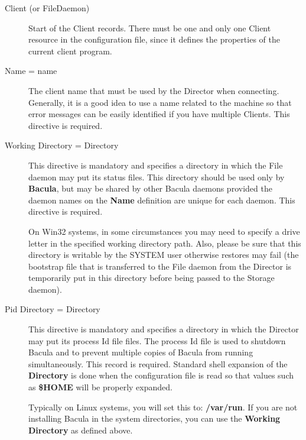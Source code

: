 \begin{description}

\item [Client (or FileDaemon)]
   Start of the Client records.  There must be one and only one Client resource
   in the  configuration file, since it defines the properties of the  current
   client program. 

\item [Name = \lt{}name\gt{}]
   The client name that must be used  by the Director when connecting. Generally,
   it is a good idea  to use a name related to the machine so that error messages
   can be easily identified if you have multiple Clients.  This directive is
   required.  

\item [Working Directory = \lt{}Directory\gt{}]
   This directive  is mandatory and specifies a directory in which the File
   daemon  may put its status files. This directory should be used only  by {\bf
   Bacula}, but may be shared by other Bacula daemons provided the daemon
   names on the {\bf Name} definition are unique for each daemon. This directive
   is required. 

   On Win32 systems, in some circumstances you may need to specify a drive
   letter in the specified working directory path.  Also, please be sure
   that this directory is writable by the SYSTEM user otherwise restores
   may fail (the bootstrap file that is transferred to the File daemon from
   the Director is temporarily put in this directory before being passed
   to the Storage daemon).

\item [Pid Directory = \lt{}Directory\gt{}]
   This directive  is mandatory and specifies a directory in which the Director 
   may put its process Id file files. The process Id file is used to  shutdown
   Bacula and to prevent multiple copies of  Bacula from running simultaneously. 
   This record is required. Standard shell expansion of the {\bf Directory}  is
   done when the configuration file is read so that values such  as {\bf \$HOME}
   will be properly expanded.  

   Typically on Linux systems, you will set this to:  {\bf /var/run}. If you are
   not installing Bacula in the  system directories, you can use the {\bf Working
   Directory} as  defined above. 


\end{description}

